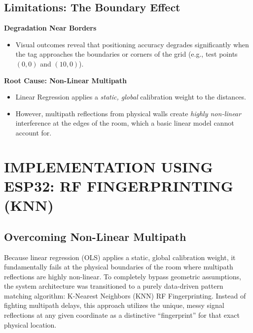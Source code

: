 \documentclass[conference]{IEEEtran}
\begin{document}
\subsection{Limitations: The Boundary Effect}

\noindent \textbf{Degradation Near Borders}
\begin{itemize}
    \item Visual outcomes reveal that positioning accuracy degrades significantly when the tag approaches the boundaries or corners of the grid (e.g., test points $(0,0)$ and $(10,0)$).
\end{itemize}

\noindent \textbf{Root Cause: Non-Linear Multipath}
\begin{itemize}
    \item Linear Regression applies a \textit{static, global} calibration weight to the distances. 
    \item However, multipath reflections from physical walls create \textit{highly non-linear} interference at the edges of the room, which a basic linear model cannot account for.
\end{itemize}

\newpage
\section{IMPLEMENTATION USING ESP32: RF FINGERPRINTING (KNN)}

\subsection{Overcoming Non-Linear Multipath}
Because linear regression (OLS) applies a static, global calibration weight, it fundamentally fails at the physical boundaries of the room where multipath reflections are highly non-linear. To completely bypass geometric assumptions, the system architecture was transitioned to a purely data-driven pattern matching algorithm: K-Nearest Neighbors (KNN) RF Fingerprinting. Instead of fighting multipath delays, this approach utilizes the unique, messy signal reflections at any given coordinate as a distinctive ``fingerprint'' for that exact physical location.
\end{document}

